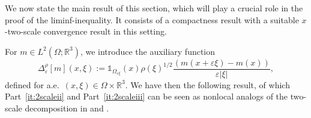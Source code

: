 \documentclass[reqno,11pt]{amsart}
\numberwithin{equation}{section}
\theoremstyle{thmlemcorr}
\numberwithin{theorem}{section}
\theoremstyle{thmlemcorr*}
\theoremstyle{defi}
\theoremstyle{remexample}
\theoremstyle{ass}
\newcommand{\R}{\mathbb{R}}
\renewcommand{\epsilon}{\varepsilon}
\newcommand{\1}{\mathds{1}}
\newcommand{\veps}{\varepsilon}
\begin{document}
We now state the main result of this section, which will play a crucial role in the proof of the liminf-inequality. It consists of a compactness result with a suitable $x$-two-scale convergence result in this setting. %

For $m \in L^2(\Omega;\R^3)$, we introduce the auxiliary function
\begin{equation}\label{eq:vepsform}
\Delta^{\rho}_\epsilon [m](x,\xi):=\1_{\Omega_{\epsilon\xi}}(x)\rho(\xi)^{1/2}\frac{(m(x+\epsilon\xi)-m(x))}{\epsilon|\xi|},
\end{equation}
defined for a.e.\ $(x,\xi) \in \Omega \times \R^3$. We have then the following result, of which Part~\ref{it:2scaleii} and Part~\ref{it:2scaleiii} can be seen as nonlocal analogs of the two-scale decomposition in \cite[Proposition~1.14~(i)]{All92} and \cite[Proposition~2.2]{DaD20}.
\end{document}

